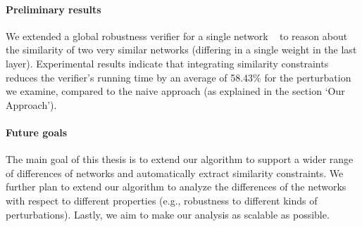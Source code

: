 \paragraph{Preliminary results}
We extended a global robustness verifier for a single network ~\cite{VHAGAR} to reason about the similarity of two very similar networks (differing in a single weight in the last layer). 
Experimental results indicate that integrating similarity constraints reduces the verifier’s running time by an average of 58.43\% for the perturbation we examine, compared to the naive approach (as explained in the section ‘Our Approach’).


\paragraph{Future goals}
The main goal of this thesis is to extend our algorithm to support a wider range of differences of networks and automatically extract similarity constraints. We further plan to extend our algorithm to analyze the differences of the networks with respect to different properties (e.g., robustness to different kinds of perturbations). Lastly, we aim to make our analysis as scalable as possible. 